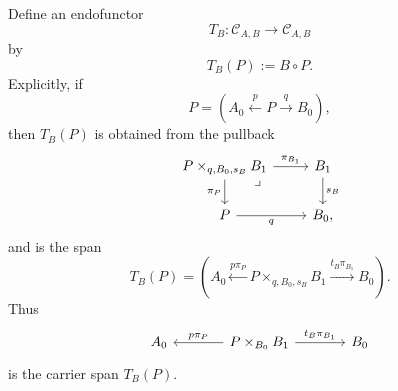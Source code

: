\begin{definition}
\label{def:output-comparison-endofunctor}
    Define an endofunctor
    \[
        T_B:\mathcal C_{A,B}\to\mathcal C_{A,B}
    \]
    by
    \[
        T_B(P):=B\circ P.
    \]
    Explicitly, if
    \[
        P=
        \left(
            A_0
            \xleftarrow{p}
            P
            \xrightarrow{q}
            B_0
        \right),
    \]
    then \(T_B(P)\) is obtained from the pullback
    \[
        \begin{tikzcd}
                P\times_{q,B_0,s_B}B_1
                    \arrow[r, "\pi_{B_1}"]
                    \arrow[d, "\pi_P"']
                    \arrow[dr, phantom, "\lrcorner", very near start]
            &
                B_1
                    \arrow[d, "s_B"]
            \\
                P
                    \arrow[r, "q"']
            &
                B_0,
        \end{tikzcd}
    \]
    and is the span
    \[
        T_B(P)
        =
        \left(
            A_0
            \xleftarrow{p\pi_P}
            P\times_{q,B_0,s_B}B_1
            \xrightarrow{t_B\pi_{B_1}}
            B_0
        \right).
    \]
    Thus
    \[
        \begin{tikzcd}[column sep=large]
                A_0
            &
                P\times_{B_0}B_1
                    \arrow[l, "p\pi_P"']
                    \arrow[r, "t_B\pi_{B_1}"]
            &
                B_0
        \end{tikzcd}
    \]
    is the carrier span \(T_B(P)\).


\end{definition}
